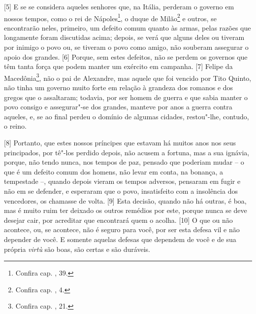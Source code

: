 {[}5{]} E se se considera aqueles senhores que, na Itália, perderam o
governo em nossos tempos, como o rei de Nápoles\footnote{Confira cap.
  , 39.}, o duque de Milão\footnote{Confira cap. , 4.} e outros,
se encontrarão neles, primeiro, um defeito comum quanto às armas, pelas
razões que longamente foram discutidas acima; depois, se verá que alguns
deles ou tiveram por inimigo o povo ou, se tiveram o povo como amigo,
não souberam assegurar o apoio dos grandes. {[}6{]} Porque, sem estes
defeitos, não se perdem os governos que têm tanta força que podem manter
um exército em campanha. {[}7{]} Felipe da Macedônia\footnote{Confira
  cap. , 21.}, não o pai de Alexandre, mas aquele que foi vencido por
Tito Quinto, não tinha um governo muito forte em relação à grandeza dos
romanos e dos gregos que o assaltaram; todavia, por ser homem de guerra
e que sabia manter o povo consigo e assegurar"-se dos grandes, manteve
por anos a guerra contra aqueles, e, se ao final perdeu o domínio de
algumas cidades, restou"-lhe, contudo, o reino.

{[}8{]} Portanto, que estes nossos príncipes que estavam há muitos anos
nos seus principados, por tê"-los perdido depois, não acusem a fortuna,
mas a sua ignávia, porque, não tendo nunca, nos tempos de paz, pensado
que poderiam mudar -- o que é um defeito comum dos homens, não levar em
conta, na bonança, a tempestade --, quando depois vieram os tempos
adversos, pensaram em fugir e não em se defender, e esperaram que o
povo, insatisfeito com a insolência dos vencedores, os chamasse de
volta. {[}9{]} Esta decisão, quando não há outras, é boa, mas é muito
ruim ter deixado os outros remédios por este, porque nunca se deve
desejar cair, por acreditar que encontrará quem o acolha. {[}10{]} O que
ou não acontece, ou, se acontece, não é seguro para você, por ser esta
defesa vil e não depender de você. E somente aquelas defesas que
dependem de você e de sua própria \emph{virtù} são boas, são certas e
são duráveis.


